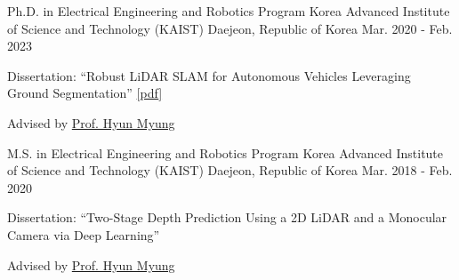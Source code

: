 

\begin{cventries}
%
%
  \cventry
  {Ph.D. in Electrical Engineering and Robotics Program} %
  {Korea Advanced Institute of Science and Technology (KAIST)} %
  {Daejeon, Republic of Korea} %
  {Mar. 2020 - Feb. 2023} %
  {
    \begin{cvitems} %
      \item {Dissertation: ``Robust LiDAR SLAM for Autonomous Vehicles Leveraging Ground Segmentation'' \ifshowcontent \href{https://www.dropbox.com/s/0j64sbsrhpyjdgm/hyungtae_lim_dissertation.pdf?dl=0}{[\underline{pdf}]} \fi}
      \item {Advised by \href{https://urobot.kaist.ac.kr/url_teams/prof-hyunmyung/}{Prof. Hyun Myung}}
    \end{cvitems}
  }

  \cventry
  {M.S. in Electrical Engineering and Robotics Program} %
  {Korea Advanced Institute of Science and Technology (KAIST)} %
  {Daejeon, Republic of Korea} %
  {Mar. 2018 - Feb. 2020} %
  {
    \begin{cvitems} %
      \item {Dissertation: ``Two-Stage Depth Prediction Using a 2D LiDAR and a Monocular Camera via Deep Learning''}
      \item {Advised by \href{https://urobot.kaist.ac.kr/url_teams/prof-hyunmyung/}{Prof. Hyun Myung}}
    \end{cvitems}
  }


\end{cventries}
